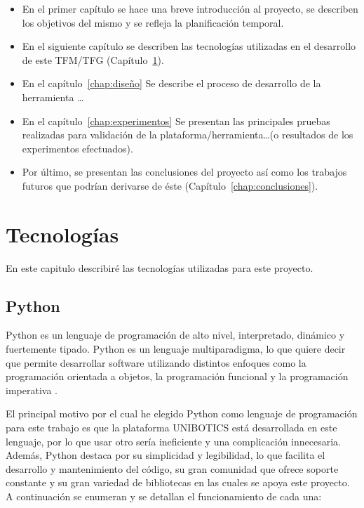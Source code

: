 \documentclass[a4paper, 12pt]{book}
\begin{document}
    \begin{itemize}
      \item En el primer capítulo se hace una breve introducción al proyecto, se describen los objetivos del mismo y se refleja la planificación temporal.
      \item En el siguiente capítulo se describen las tecnologías utilizadas en el desarrollo de este TFM/TFG (Capítulo~\ref{chap:tecnologias}).
      \item En el capítulo~\ref{chap:diseño} Se describe el proceso de desarrollo
      de la herramienta \ldots
      \item En el capítulo~\ref{chap:experimentos} Se presentan las principales pruebas realizadas
      para validación de la plataforma/herramienta\ldots (o resultados de los experimentos
      efectuados).
      \item Por último, se presentan las conclusiones del proyecto así como los trabajos futuros que podrían derivarse de éste (Capítulo~\ref{chap:conclusiones}).
    \end{itemize}

\cleardoublepage


\chapter{Tecnologías}               %
\label{chap:tecnologias}

En este capitulo describiré las tecnologías utilizadas para este proyecto.


\section{Python}
\label{sec:python}

Python es un lenguaje de programación de alto nivel, interpretado, dinámico y fuertemente tipado. Python es un lenguaje multiparadigma, lo que quiere decir que permite desarrollar software utilizando distintos enfoques como la programación orientada a objetos, la programación funcional y
la programación imperativa \cite{intropython}.

El principal motivo por el cual he elegido Python como lenguaje de programación para este trabajo es que la plataforma UNIBOTICS está desarrollada en este lenguaje, por lo que usar otro sería ineficiente y una complicación innecesaria. Además, Python destaca por su simplicidad y legibilidad, lo que facilita el desarrollo y mantenimiento del código, su gran comunidad que ofrece soporte constante y su gran variedad de bibliotecas en las cuales se apoya este proyecto. A continuación se enumeran y se detallan el funcionamiento de cada una:
\end{document}
